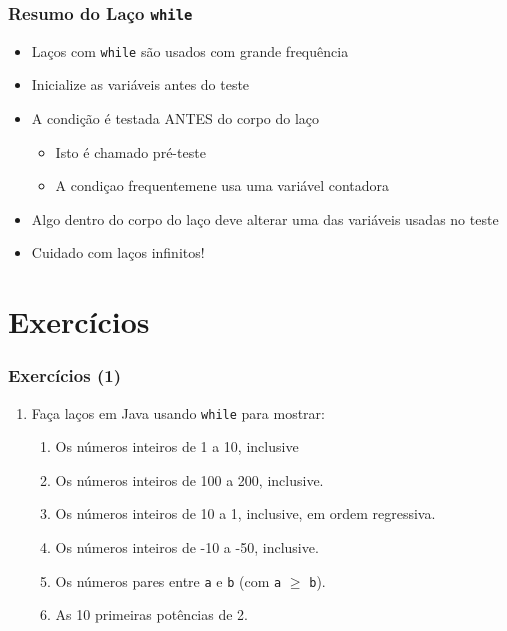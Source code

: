 \documentclass[xcolor={dvipsnames,table},aspectratio=169]{beamer}
\begin{document}
\begin{frame}\frametitle{Resumo do Laço \texttt{while}}
\begin{itemize}
	\item Laços com \texttt{while} são usados com grande frequência
	\item Inicialize as variáveis antes do teste
	\item A condição é testada ANTES do corpo do laço
	\begin{itemize}
		\item Isto é chamado pré-teste
		\item A condiçao frequentemene usa uma variável contadora
	\end{itemize}
	\item Algo dentro do corpo do laço deve alterar uma das variáveis usadas no teste
	\item Cuidado com laços infinitos!
\end{itemize}
\end{frame}

\section{Exercícios}

\begin{frame}\frametitle{Exercícios (1)}	
\begin{enumerate}
	\item Faça laços em Java usando \texttt{while} para mostrar:
	\begin{enumerate}[a]	
		\item Os números inteiros de 1 a 10, inclusive
		\item Os números inteiros de 100 a 200, inclusive.
		\item Os números inteiros de 10 a 1, inclusive, em ordem regressiva.
		\item Os números inteiros de -10 a -50, inclusive.
		\item Os números pares entre \texttt{a} e \texttt{b} (com \texttt{a} $\ge$ \texttt{b}).
		\item As 10 primeiras potências de 2.
	\end{enumerate}
\end{enumerate}
\end{frame}
\end{document}
